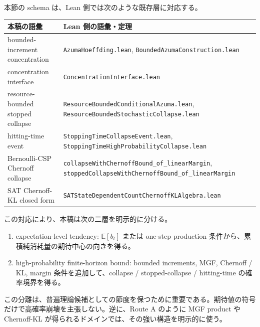 \documentclass[12pt,a4paper]{article}
\begin{document}
本節の schema は、Lean 側では次のような既存層に対応する。

{\def\LTcaptype{table} %
\begin{longtable}[]{@{}
  >{\raggedright\arraybackslash}p{}
  >{\raggedright\arraybackslash}p{}@{}}
\toprule\noalign{}
\begin{minipage}[b]{\linewidth}\raggedright
本稿の語彙
\end{minipage} & \begin{minipage}[b]{\linewidth}\raggedright
Lean 側の語彙・定理
\end{minipage} \\
\midrule\noalign{}
\endhead
\bottomrule\noalign{}
\endlastfoot
bounded-increment concentration & \texttt{AzumaHoeffding.lean}, \texttt{BoundedAzumaConstruction.lean} \\
concentration interface & \texttt{ConcentrationInterface.lean} \\
resource-bounded stopped collapse & \texttt{ResourceBoundedConditionalAzuma.lean}, \texttt{ResourceBoundedStochasticCollapse.lean} \\
hitting-time event & \texttt{StoppingTimeCollapseEvent.lean}, \texttt{StoppingTimeHighProbabilityCollapse.lean} \\
Bernoulli-CSP Chernoff collapse & \texttt{collapseWithChernoffBound\_of\_linearMargin}, \texttt{stoppedCollapseWithChernoffBound\_of\_linearMargin} \\
SAT Chernoff-KL closed form & \texttt{SATStateDependentCountChernoffKLAlgebra.lean} \\
\end{longtable}
}

この対応により、本稿は次の二層を明示的に分ける。

\begin{enumerate}
\def\labelenumi{\arabic{enumi}.}
\tightlist
\item
  expectation-level tendency: \(\mathbb E[b_{t}]\) または one-step production 条件から、累積純消耗量の期待中心の向きを得る。
\item
  high-probability finite-horizon bound: bounded increments, MGF, Chernoff / KL, margin 条件を追加して、collapse / stopped-collapse / hitting-time の確率境界を得る。
\end{enumerate}

この分離は、普遍理論候補としての節度を保つために重要である。期待値の符号だけで高確率崩壊を主張しない。逆に、Route A のように MGF product や Chernoff-KL が得られるドメインでは、その強い構造を明示的に使う。
\end{document}
